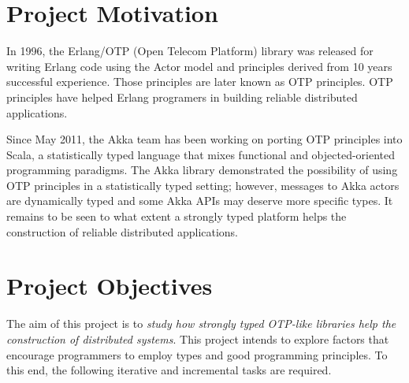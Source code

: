\section{Project Motivation}
In 1996, the Erlang/OTP (Open Telecom Platform) library\cite{ErlangWeb} was released for writing Erlang code using the Actor model\cite{Hewitt:1973} and principles derived from 10 years successful experience.  Those principles are later known as OTP principles.  OTP principles have helped Erlang programers in building reliable distributed applications.\cite{ArmstrongErlang}

Since May 2011, the Akka team has been working on porting OTP principles into Scala, a statistically typed language that mixes functional and objected-oriented programming paradigms.  The Akka library\cite{akka_doc, akka_api} demonstrated the possibility of using OTP principles in a statistically typed setting; however, messages to Akka actors are dynamically typed and some Akka APIs may deserve more specific types.  It remains to be seen to what extent a strongly typed platform helps the construction of reliable distributed applications.

\section{Project Objectives}
The aim of this project is to {\it{study how strongly typed OTP-like libraries help the construction of distributed systems}}.  This project intends to explore factors that encourage programmers to employ types and good programming principles.  To this end, the following iterative and incremental tasks are required.

